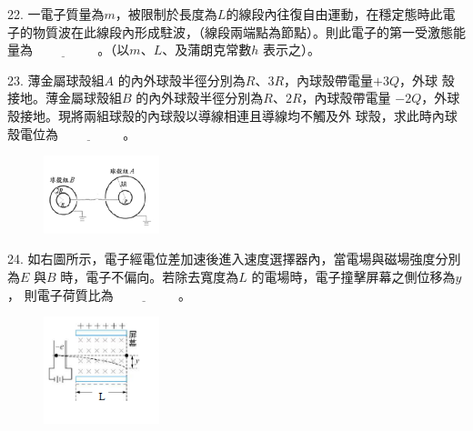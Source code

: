 \documentclass[cn,10pt,math=newtx,chinesefont=founder,device=ig]{elegantbook}
\begin{document}
\begin{example}
   22. 一電子質量為$m$，被限制於長度為$L$的線段內往復自由運動，在穩定態時此電子的物質波在此線段內形成駐波，（線段兩端點為節點）。則此電子的第一受激態能量為$\underline{\hspace{2cm}}$ 。（以$m、L$、及蒲朗克常數$h$
表示之）。\\
    \rightline{[中壢高中教甄109]}
\end{example}
\begin{solution}
    
\end{solution}

\newpage

\begin{example}
   23. 薄金屬球殼組$A$ 的內外球殼半徑分別為$R$、$3R$，內球殼帶電量$+3Q$，外球
殼接地。薄金屬球殼組$B$ 的內外球殼半徑分別為$R$、$2R$，內球殼帶電量
$-2Q$，外球殼接地。現將兩組球殼的內球殼以導線相連且導線均不觸及外
球殼，求此時內球殼電位為$\underline{\hspace{2cm}}$ 。\\
    \rightline{[中壢高中教甄109]}
\end{example}
\begin{solution}
    
\end{solution}
\begin{figure}[htbp]
    \flushright
    \includegraphics[width=0.3\textwidth]{image/109中壢23.png}
  \end{figure}
\newpage

\begin{example}
   24. 如右圖所示，電子經電位差加速後進入速度選擇器內，當電場與磁場強度分別為$E$
與$B$ 時，電子不偏向。若除去寬度為$L$ 的電場時，電子撞擊屏幕之側位移為$y$，
則電子荷質比為$\underline{\hspace{2cm}}$ 。\\
    \rightline{[中壢高中教甄109]}
\end{example}
\begin{solution}
    
\end{solution}
\begin{figure}[htbp]
    \flushright
    \includegraphics[width=0.3\textwidth]{image/109中壢24.png}
  \end{figure}
\newpage
\end{document}
